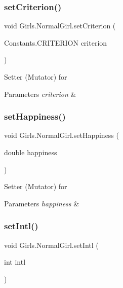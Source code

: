 \subsubsection{\texorpdfstring{set\+Criterion()}{setCriterion()}}
{\footnotesize\ttfamily void Girls.\+Normal\+Girl.\+set\+Criterion (\begin{DoxyParamCaption}\item[{Constants.\+C\+R\+I\+T\+E\+R\+I\+ON}]{criterion }\end{DoxyParamCaption})\hspace{0.3cm}{\ttfamily [inline]}}

Setter (Mutator) for 
\begin{DoxyParams}{Parameters}
{\em criterion} & \\
\hline
\end{DoxyParams}
\mbox{\label{class_girls_1_1_normal_girl_a48194fff57fe10b8dded3e6456241993}} 
\subsubsection{\texorpdfstring{set\+Happiness()}{setHappiness()}}
{\footnotesize\ttfamily void Girls.\+Normal\+Girl.\+set\+Happiness (\begin{DoxyParamCaption}\item[{double}]{happiness }\end{DoxyParamCaption})\hspace{0.3cm}{\ttfamily [inline]}}

Setter (Mutator) for 
\begin{DoxyParams}{Parameters}
{\em happiness} & \\
\hline
\end{DoxyParams}
\mbox{\label{class_girls_1_1_normal_girl_a37703e945d50081f3c4f17021185b523}} 
\subsubsection{\texorpdfstring{set\+Intl()}{setIntl()}}
{\footnotesize\ttfamily void Girls.\+Normal\+Girl.\+set\+Intl (\begin{DoxyParamCaption}\item[{int}]{intl }\end{DoxyParamCaption})\hspace{0.3cm}{\ttfamily [inline]}}

